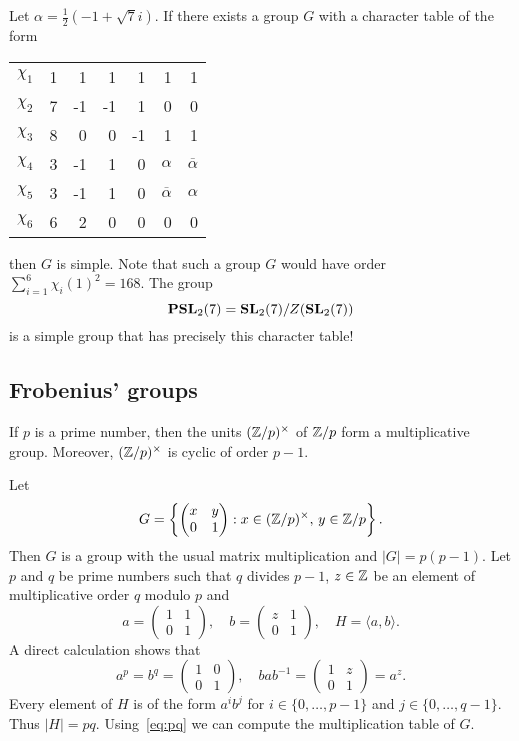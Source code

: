 \begin{example}
    Let $\alpha=\frac{1}{2}(-1+\sqrt{7}i)$. 
    If there exists a group $G$ with a character table
    of the form
    \begin{center}
		\begin{tabular}{|c|rrrrrr|}
			\hline
			$\chi_{1}$ & 1 & 1 & 1 & 1 & 1 & 1\tabularnewline
			$\chi_{2}$ & 7 & -1 & -1 & 1 & 0 & 0 \tabularnewline
			$\chi_{3}$ & 8 & 0 & 0 & -1 & 1 & 1\tabularnewline
		    $\chi_{4}$ & 3 & -1 & 1 & 0 & $\alpha$ & $\overline{\alpha}$ \tabularnewline
			$\chi_{5}$ & 3 & -1 & 1 & 0 & $\overline{\alpha}$ & $\alpha$\tabularnewline
			$\chi_{6}$ & 6 & 2 & 0 & 0 & 0 & 0\tabularnewline
			\hline
		\end{tabular}
	\end{center}    
	then $G$ is simple. Note that such a group $G$ would have order 
	$\sum_{i=1}^6\chi_i(1)^2=168$. 
	The group  
	\[
	\mathbf{PSL}_2(7)=\mathbf{SL}_2(7)/Z(\mathbf{SL}_2(7))
	\]
	is a simple group that has precisely this character table!  
\end{example}

\subsection{Frobenius' groups}
\label{Frobenius}

If $p$ is a prime number, then
the units $(\mathbb{Z}/p)^{\times}$ 
of $\mathbb{Z}/p$ form a multiplicative group. Moreover, 
$(\mathbb{Z}/p)^{\times}$ 
is cyclic of order $p-1$. 

Let 
\[
G=\left\{\begin{pmatrix}
x & y\\
0 & 1
\end{pmatrix}
:x\in(\mathbb{Z}/p)^\times,\,y\in\mathbb{Z}/p\right\}.
\]
Then $G$ is a group with the usual matrix multiplication
and $|G|=p(p-1)$. 
Let $p$ and $q$ be prime numbers such that $q$ divides $p-1$, 
$z\in\mathbb{Z}$ be an element of multiplicative order $q$ modulo $p$ 
and 
\[
a=\begin{pmatrix}
1&1\\
0&1
\end{pmatrix},
\quad
b=\begin{pmatrix}
z&1\\
0&1
\end{pmatrix},
\quad
H=\langle a,b\rangle.
\]
A direct calculation shows that 
\begin{equation}
\label{eq:pq}
a^p=b^q=\begin{pmatrix}
1&0\\
0&1
\end{pmatrix},
\quad
bab^{-1}=\begin{pmatrix}
1&z\\
0&1
\end{pmatrix}
=a^z.
\end{equation}
Every element of $H$ is of the form $a^ib^j$ for $i\in\{0,\dots,p-1\}$ and  $j\in\{0,\dots,q-1\}$. 
Thus $|H|=pq$. Using~\eqref{eq:pq} we can compute 
the multiplication table of $G$. 

